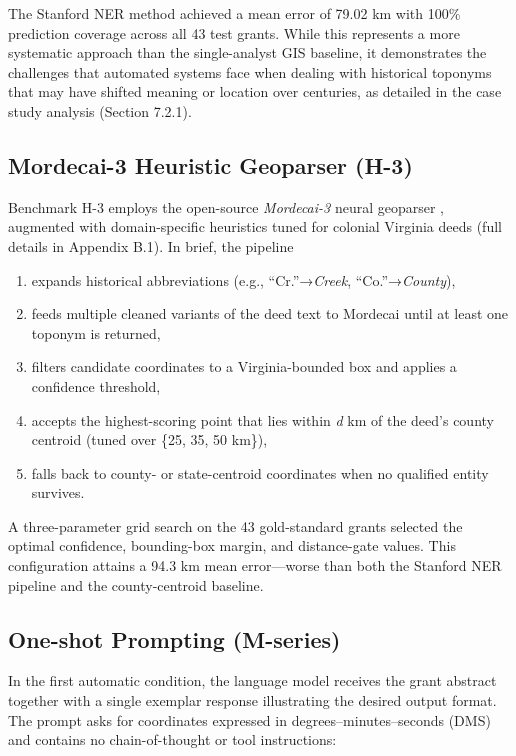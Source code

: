 The Stanford NER method achieved a mean error of 79.02 km with 100\%
prediction coverage across all 43 test grants. While this represents a
more systematic approach than the single-analyst GIS baseline, it
demonstrates the challenges that automated systems face when dealing
with historical toponyms that may have shifted meaning or location over
centuries, as detailed in the case study analysis (Section 7.2.1).

\subsection{Mordecai-3 Heuristic Geoparser
(H-3)}\label{mordecai-3-heuristic-geoparser-h-3}

Benchmark H-3 employs the open-source \emph{Mordecai-3} neural geoparser
\citep{halterman2023mordecai}, augmented with domain-specific heuristics
tuned for colonial Virginia deeds (full details in Appendix B.1). In
brief, the pipeline

\begin{enumerate}
\def\labelenumi{\arabic{enumi}.}
\tightlist
\item
  expands historical abbreviations (e.g., ``Cr.''→\emph{Creek},
  ``Co.''→\emph{County}),
\item
  feeds multiple cleaned variants of the deed text to Mordecai until at
  least one toponym is returned,
\item
  filters candidate coordinates to a Virginia-bounded box and applies a
  confidence threshold,
\item
  accepts the highest-scoring point that lies within \emph{d} km of the
  deed's county centroid (tuned over \{25, 35, 50 km\}),
\item
  falls back to county- or state-centroid coordinates when no qualified
  entity survives.
\end{enumerate}

A three-parameter grid search on the 43 gold-standard grants selected
the optimal confidence, bounding-box margin, and distance-gate values.
This configuration attains a 94.3 km mean error---worse than both the
Stanford NER pipeline and the county-centroid baseline.

\subsection{One-shot Prompting
(M-series)}\label{one-shot-prompting-m-series}

In the first automatic condition, the language model receives the grant
abstract together with a single exemplar response illustrating the
desired output format. The prompt asks for coordinates expressed in
degrees--minutes--seconds (DMS) and contains no chain-of-thought or tool
instructions:

